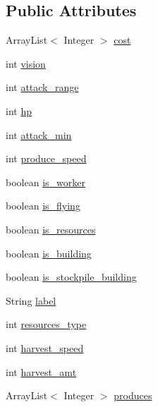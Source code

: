 \subsection*{Public Attributes}
\begin{DoxyCompactItemize}
\item 
ArrayList$<$ Integer $>$ \hyperlink{classrts_1_1units_1_1_unit_definition_a621eaa47f5ce5487e99be5d582c54c33}{cost}
\item 
int \hyperlink{classrts_1_1units_1_1_unit_definition_a9a1bbc5eb71c750e90afc3a79dc3b77e}{vision}
\item 
int \hyperlink{classrts_1_1units_1_1_unit_definition_a10e9d5f6303b4163258104d1bb8288f4}{attack\_\-range}
\item 
int \hyperlink{classrts_1_1units_1_1_unit_definition_afecdbd9a5890ebb475d34a5834a0abc0}{hp}
\item 
int \hyperlink{classrts_1_1units_1_1_unit_definition_a35c3e9d08e32aa6554de76e3c7d22b7a}{attack\_\-min}
\item 
int \hyperlink{classrts_1_1units_1_1_unit_definition_a2acacfe67b538b94d5e1aecd00aa8a34}{produce\_\-speed}
\item 
boolean \hyperlink{classrts_1_1units_1_1_unit_definition_ab56da53694b3eeec7e24fba6fc3aa500}{is\_\-worker}
\item 
boolean \hyperlink{classrts_1_1units_1_1_unit_definition_ad16bc63a9121e6d327accfb49491845b}{is\_\-flying}
\item 
boolean \hyperlink{classrts_1_1units_1_1_unit_definition_a02c546537c02fc39ab83369d9aae7ab6}{is\_\-resources}
\item 
boolean \hyperlink{classrts_1_1units_1_1_unit_definition_ad9cc09f9dae262a248847b08625ecf4f}{is\_\-building}
\item 
boolean \hyperlink{classrts_1_1units_1_1_unit_definition_ab7c8fcae3721ec03d2dfa3464bedcfa0}{is\_\-stockpile\_\-building}
\item 
String \hyperlink{classrts_1_1units_1_1_unit_definition_af295ec9a14f5e3168e03fe657faac23c}{label}
\item 
int \hyperlink{classrts_1_1units_1_1_unit_definition_adb712577cc331591cb2c7023a7cbf82e}{resources\_\-type}
\item 
int \hyperlink{classrts_1_1units_1_1_unit_definition_af0c5b79341dc1b40aadb99ef41de109c}{harvest\_\-speed}
\item 
int \hyperlink{classrts_1_1units_1_1_unit_definition_a341c9c6afecb398f663bcdfe627f3f9f}{harvest\_\-amt}
\item 
ArrayList$<$ Integer $>$ \hyperlink{classrts_1_1units_1_1_unit_definition_a4814093e7c3fdd9fd653c6d5a057158a}{produces}

\end{DoxyCompactItemize}
